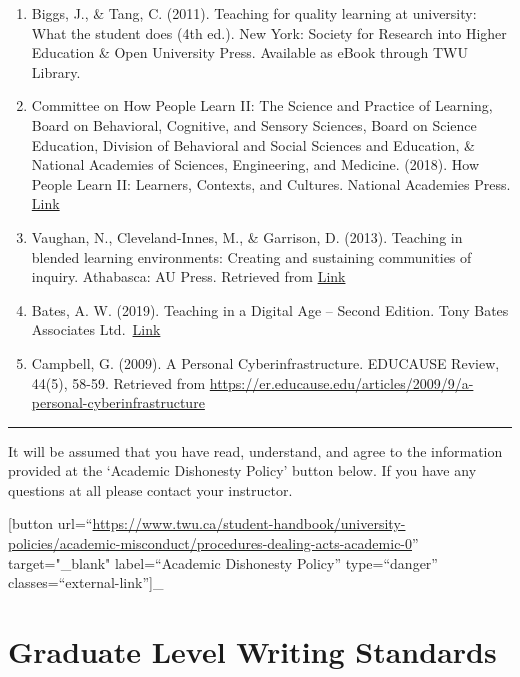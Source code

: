 \documentclass[
]{book}
\providecommand{\tightlist}{%
  \setlength{\itemsep}{0pt}\setlength{\parskip}{0pt}}
\begin{document}
\begin{enumerate}
\def\labelenumi{\arabic{enumi}.}
\tightlist
\item
  Biggs, J., \& Tang, C. (2011). Teaching for quality learning at university: What the student does (4th ed.). New York: Society for Research into Higher Education \& Open University Press. Available as eBook through TWU Library.\\
\item
  Committee on How People Learn II: The Science and Practice of Learning, Board on Behavioral, Cognitive, and Sensory Sciences, Board on Science Education, Division of Behavioral and Social Sciences and Education, \& National Academies of Sciences, Engineering, and Medicine. (2018). How People Learn II: Learners, Contexts, and Cultures. National Academies Press. \href{https://doi.org/10.17226/24783}{Link}
\item
  Vaughan, N., Cleveland-Innes, M., \& Garrison, D. (2013). Teaching in blended learning environments: Creating and sustaining communities of inquiry. Athabasca: AU Press. Retrieved from \href{http://www.aupress.ca/index.php/books/120229}{Link}\\
\item
  Bates, A. W. (2019). Teaching in a Digital Age -- Second Edition. Tony Bates Associates Ltd.~\href{https://pressbooks.bccampus.ca/teachinginadigitalagev2/}{Link}
\item
  Campbell, G. (2009). A Personal Cyberinfrastructure. EDUCAUSE Review, 44(5), 58-59. Retrieved from \url{https://er.educause.edu/articles/2009/9/a-personal-cyberinfrastructure}
\end{enumerate}

\begin{center}\rule{0.5\linewidth}{0.5pt}\end{center}

It will be assumed that you have read, understand, and agree to the information provided at the `Academic Dishonesty Policy' button below. If you have any questions at all please contact your instructor.

{[}button url=``\url{https://www.twu.ca/student-handbook/university-policies/academic-misconduct/procedures-dealing-acts-academic-0}'' target="\_blank" label=``Academic Dishonesty Policy'' type=``danger'' classes=``external-link''{]}\_

\hypertarget{graduate-level-writing-standards}{%
\section{Graduate Level Writing Standards}\label{graduate-level-writing-standards}}
\end{document}
